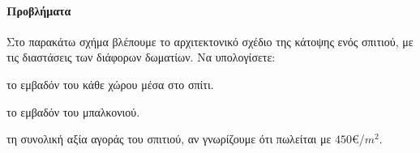 \documentclass[11pt,a4paper,modern]{FFExercises}
\begin{document}
\paragraph{Προβλήματα}
\askhsh Στο παρακάτω σχήμα βλέπουμε το αρχιτεκτονικό σχέδιο της κάτοψης ενός σπιτιού, με τις διαστάσεις των διάφορων δωματίων. Να υπολογίσετε:
\begin{center}

\end{center}
\begin{alist}
\item το εμβαδόν του κάθε χώρου μέσα στο σπίτι.
\item το εμβαδόν του μπαλκονιού.
\item τη συνολική αξία αγοράς του σπιτιού, αν γνωρίζουμε ότι πωλείται με $450$\euro/$\si{m^2}$.
\end{alist}
\end{document}
